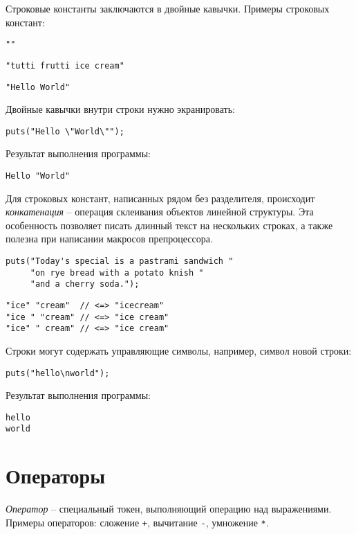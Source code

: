 \documentclass[myc.tex]{subfiles}
\begin{document}
Строковые константы заключаются в двойные кавычки. Примеры строковых констант:

\texttt{"{}"}

\texttt{"tutti frutti ice cream"}

\texttt{"Hello World"}

Двойные кавычки внутри строки нужно экранировать:
\begin{lstlisting}
puts("Hello \"World\"");
\end{lstlisting}
Результат выполнения программы:
\begin{verbatim}
Hello "World"
\end{verbatim} 

Для строковых констант, написанных рядом без разделителя, происходит \textit{конкатенация} -- операция склеивания объектов линейной структуры. Эта особенность позволяет писать длинный текст на нескольких строках, а также полезна при написании макросов препроцессора.

\begin{lstlisting}
puts("Today's special is a pastrami sandwich "
     "on rye bread with a potato knish "
     "and a cherry soda.");
\end{lstlisting}

\begin{lstlisting}
"ice" "cream"  // <=> "icecream"
"ice " "cream" // <=> "ice cream"
"ice" " cream" // <=> "ice cream"
\end{lstlisting}

Строки могут содержать управляющие символы, например, символ новой строки:
\begin{lstlisting}
puts("hello\nworld");
\end{lstlisting}
Результат выполнения программы:
\begin{verbatim}
hello
world
\end{verbatim} 


















\section{Операторы}

\textit{Оператор} -- специальный токен, выполняющий операцию над выражениями. Примеры операторов: сложение \texttt{+}, вычитание \texttt{-}, умножение \texttt{*}.
\end{document}
